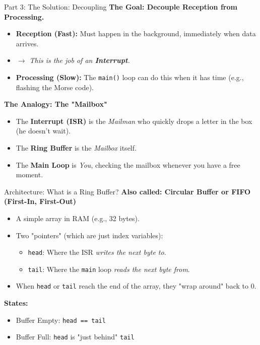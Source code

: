 \documentclass{beamer}
\begin{document}
\begin{frame}{Part 3: The Solution: Decoupling}
\textbf{The Goal: Decouple Reception from Processing.}
\begin{itemize}
\item \textbf{Reception (Fast):} Must happen in the background, immediately when data arrives.
\item \textit{$\rightarrow$ This is the job of an \textbf{Interrupt}.}
\item \textbf{Processing (Slow):} The \texttt{main()} loop can do this when it has time (e.g., flashing the Morse code).
\end{itemize}

\bigskip
\textbf{The Analogy: The "Mailbox"}
\begin{itemize}
\item The \textbf{Interrupt (ISR)} is the \textit{Mailman} who quickly drops a letter in the box (he doesn't wait).
\item The \textbf{Ring Buffer} is the \textit{Mailbox} itself.
\item The \textbf{Main Loop} is \textit{You}, checking the mailbox whenever you have a free moment.
\end{itemize}
\end{frame}

\begin{frame}{Architecture: What is a Ring Buffer?}
\textbf{Also called: Circular Buffer or FIFO (First-In, First-Out)}

\medskip
\begin{itemize}
\item A simple array in RAM (e.g., 32 bytes).
\item Two "pointers" (which are just index variables):
\begin{itemize}
\item \texttt{head}: Where the ISR \textit{writes the next byte to}.
\item \texttt{tail}: Where the \texttt{main} loop \textit{reads the next byte from}.
	\end{itemize}
	\item When \texttt{head} or \texttt{tail} reach the end of the array, they "wrap around" back to 0.
	\end{itemize}
		
		
		
		\textbf{States:}
		\begin{itemize}
	\item Buffer Empty: \texttt{head == tail}
	\item Buffer Full: \texttt{head} is "just behind" \texttt{tail}
	\end{itemize}
	\end{frame}
	
\end{document}
